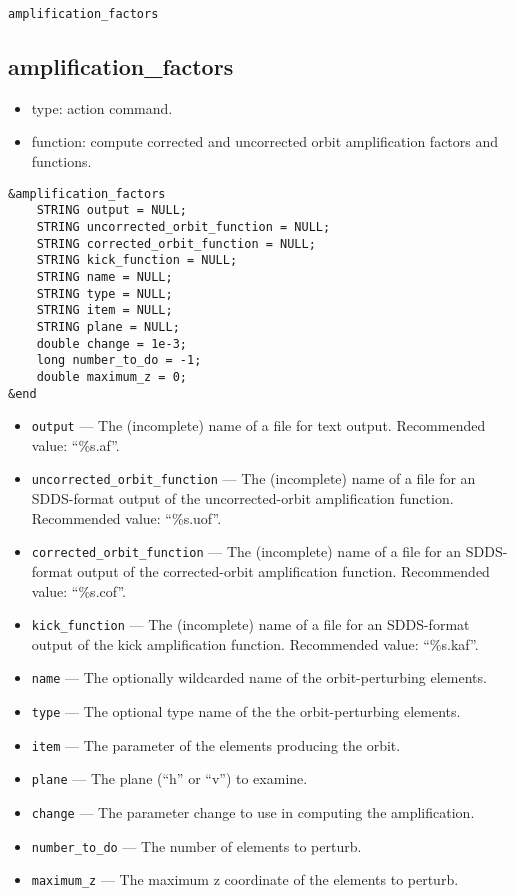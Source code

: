 \documentclass[11pt]{article}
\begin{document}
\begin{latexonly}
\newpage
\begin{center}{\Large\verb|amplification_factors|}\end{center}
\end{latexonly}
\subsection{amplification\_factors \label{subsec:amplificationfactors}}

\begin{itemize}
\item type: action command.
\item function: compute corrected and uncorrected orbit amplification factors and functions.
\end{itemize}

\begin{verbatim}
&amplification_factors
    STRING output = NULL;
    STRING uncorrected_orbit_function = NULL;
    STRING corrected_orbit_function = NULL;
    STRING kick_function = NULL;
    STRING name = NULL;
    STRING type = NULL;
    STRING item = NULL;
    STRING plane = NULL;
    double change = 1e-3;
    long number_to_do = -1;
    double maximum_z = 0;
&end
\end{verbatim}

\begin{itemize}
\item \verb|output| ---  The (incomplete) name of a file for text output.   Recommended value: ``\%s.af''.
\item \verb|uncorrected_orbit_function| --- The (incomplete) name of a file for an SDDS-format output of the
    uncorrected-orbit amplification function.  Recommended value: ``\%s.uof''.
\item \verb|corrected_orbit_function| --- The (incomplete) name of a file for an SDDS-format output of the
    corrected-orbit amplification function.  Recommended value: ``\%s.cof''.
\item \verb|kick_function| --- The (incomplete) name of a file for an SDDS-format output of the kick amplification function.
Recommended value: ``\%s.kaf''.
\item \verb|name| --- The optionally wildcarded name of the orbit-perturbing elements.  
\item \verb|type| --- The optional type name of the the orbit-perturbing elements.
\item \verb|item| --- The parameter of the elements producing the orbit.
\item \verb|plane| --- The plane (``h'' or ``v'') to examine.
\item \verb|change| --- The parameter change to use in computing the amplification.  
\item \verb|number_to_do| --- The number of elements to perturb.
\item \verb|maximum_z| --- The maximum z coordinate of the elements to perturb.
\end{itemize}
\end{document}

